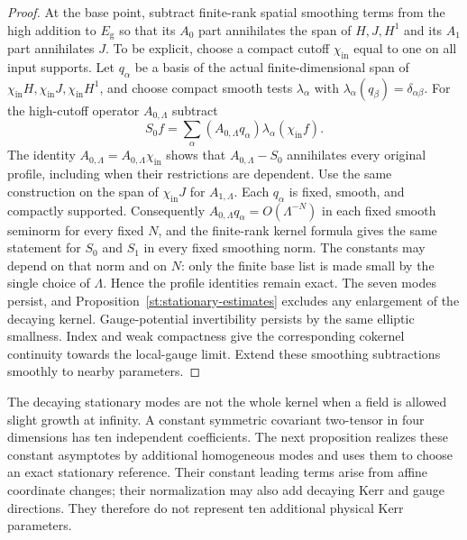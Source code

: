 \begin{proof}
At the base point, subtract finite-rank spatial smoothing terms
from the high addition to $E_{\mathrm g}$ so that its $A_0$
part annihilates the span of $H,J,H^1$ and its $A_1$ part
annihilates $J$.  To be explicit, choose a compact cutoff
$\chi_{\mathrm{in}}$ equal to one on all input supports.
Let $q_\alpha$ be a basis of the actual finite-dimensional span
of $\chi_{\mathrm{in}}H,\chi_{\mathrm{in}}J,
\chi_{\mathrm{in}}H^1$, and choose compact smooth tests
$\lambda_\alpha$ with $\lambda_\alpha(q_\beta)=\delta_{\alpha\beta}$.
For the high-cutoff operator $A_{0,\Lambda}$ subtract
\[
 S_0f=\sum_\alpha (A_{0,\Lambda}q_\alpha)
                         \lambda_\alpha(\chi_{\mathrm{in}}f).
\]
The identity $A_{0,\Lambda}=A_{0,\Lambda}\chi_{\mathrm{in}}$
shows that $A_{0,\Lambda}-S_0$ annihilates every original
profile, including when their restrictions are dependent.
Use the same construction on the span of
$\chi_{\mathrm{in}}J$ for $A_{1,\Lambda}$.
Each $q_\alpha$ is fixed, smooth, and compactly supported.
Consequently $A_{0,\Lambda}q_\alpha=O(\Lambda^{-N})$
in each fixed smooth seminorm for every fixed $N$, and the
finite-rank kernel formula gives the same statement for $S_0$
and $S_1$ in every fixed smoothing norm.  The constants may
depend on that norm and on $N$: only the finite base list is
made small by the single choice of $\Lambda$.  Hence the
profile identities remain exact.  The seven modes persist,
and Proposition~\ref{st:stationary-estimates} excludes any
enlargement of the decaying kernel.  Gauge-potential
invertibility persists by the same elliptic smallness.
Index and weak compactness give the corresponding cokernel
continuity towards the local-gauge limit.  Extend these
smoothing subtractions smoothly to nearby parameters.
\end{proof}

The decaying stationary modes are not the whole kernel when a field
is allowed slight growth at infinity.  A constant symmetric covariant
two-tensor in four dimensions has ten independent coefficients.
The next proposition realizes these constant asymptotes by additional
homogeneous modes and uses them to choose an exact stationary reference.
Their constant leading terms arise from affine coordinate changes;
their normalization may also add decaying Kerr and gauge directions.
They therefore do not represent ten additional physical Kerr parameters.

